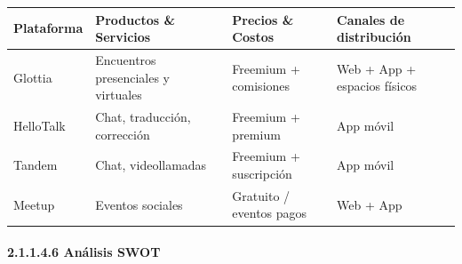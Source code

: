 {\def\LTcaptype{none} %
\begin{longtable}[]{@{}
  >{\raggedright\arraybackslash}p{}
  >{\raggedright\arraybackslash}p{}
  >{\raggedright\arraybackslash}p{}
  >{\raggedright\arraybackslash}p{}@{}}
\toprule\noalign{}
\begin{minipage}[b]{\linewidth}\raggedright
Plataforma
\end{minipage} & \begin{minipage}[b]{\linewidth}\raggedright
Productos \& Servicios
\end{minipage} & \begin{minipage}[b]{\linewidth}\raggedright
Precios \& Costos
\end{minipage} & \begin{minipage}[b]{\linewidth}\raggedright
Canales de distribución
\end{minipage} \\
\midrule\noalign{}
\endhead
\bottomrule\noalign{}
\endlastfoot
Glottia & Encuentros presenciales y virtuales & Freemium + comisiones &
Web + App + espacios físicos \\
HelloTalk & Chat, traducción, corrección & Freemium + premium & App
móvil \\
Tandem & Chat, videollamadas & Freemium + suscripción & App móvil \\
Meetup & Eventos sociales & Gratuito / eventos pagos & Web + App \\
\end{longtable}
}

\paragraph{2.1.1.4.6 Análisis
SWOT}\label{report__20-cap2-requirements-analysis.md__anuxe1lisis-swot}

